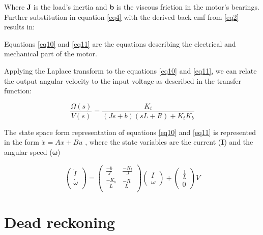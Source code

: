 Where \textbf{J} is the load's inertia and \textbf{b} is the viscous friction in the motor's bearings.
Further substitution in equation \ref{eq4} with the derived back emf from \ref{eq2} results in:

Equations \ref{eq10} and \ref{eq11} are the equations describing the electrical and mechanical part of the motor.

Applying the Laplace transform to the equations \ref{eq10} and \ref{eq11}, we can relate the output angular velocity to the input voltage as described in the transfer function:

\begin{equation} \label{eq13}
\frac{\Omega(s)}{V(s)} = \frac{K_t}{(Js + b)(sL + R) + K_tK_b}
\end{equation}

The state space form representation of equations \ref{eq10} and \ref{eq11} is represented in the form $\dot{x} = Ax + Bu$ , where the state variables are the current (\textbf{I}) and the angular speed ($\boldsymbol{\omega}$)

\begin{equation} \label{eq14} 
\begin{pmatrix}
	\dot{I} \\
	\dot{\omega} \\
\end{pmatrix} 
=
\begin{pmatrix} 
	\frac{-b}{J}   & \frac{-K_t}{J} \\
	\frac{-K_b}{L} & \frac{-R}{L} \\ 
\end{pmatrix}
\begin{pmatrix}
	I \\
	\omega
\end{pmatrix}
+
\begin{pmatrix}
	\frac{1}{L} \\
	0
\end{pmatrix}
V	
\end{equation}

\section{Dead reckoning} 

